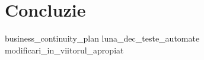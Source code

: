 \chapter{Concluzie}
{business_continuity_plan}
{luna_dec_teste_automate}
{modificari_in_viitorul_apropiat}
